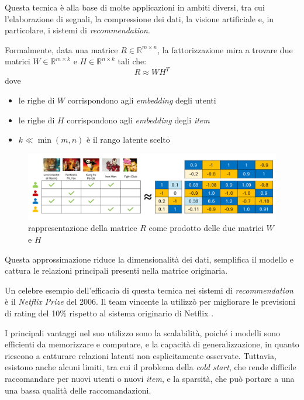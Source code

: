 Questa tecnica è alla base di molte applicazioni in ambiti diversi, tra cui l'elaborazione di segnali, la compressione dei dati, la visione artificiale e, in particolare, i sistemi di \textit{recommendation}.

Formalmente, data una matrice $R \in \mathbb{R}^{m \times n}$, la fattorizzazione mira a trovare due matrici $W \in \mathbb{R}^{m \times k}$ e $H \in \mathbb{R}^{n \times k}$ tali che:
\[
R \approx WH^T
\]
dove 
\begin{itemize}
    \item le righe di $W$ corrispondono agli \textit{embedding} degli utenti
    \item le righe di $H$ corrispondono agli \textit{embedding} degli \textit{item}
    \item $k \ll \min(m,n)$ è il rango latente scelto
\end{itemize}

\begin{figure}[H]
    \centering
    \includegraphics[scale=0.5]{figures/collaborative_filtering/matrix_factorization.PNG}
    \caption{rappresentazione della matrice $R$ come prodotto delle due matrici $W$ e $H$}
    \label{fig:matrix_factorization}
\end{figure}

Questa approssimazione riduce la dimensionalità dei dati, semplifica il modello e cattura le relazioni principali presenti nella matrice originaria.

Un celebre esempio dell'efficacia di questa tecnica nei sistemi di \textit{recommendation} è il \textit{Netflix Prize} del 2006. Il team vincente la utilizzò per migliorare le previsioni di rating del 10\% rispetto al sistema originario di Netflix \cite{TheNP}.

I principali vantaggi nel suo utilizzo sono la scalabilità, poiché i modelli sono efficienti da memorizzare e computare, e la capacità di generalizzazione, in quanto riescono a catturare relazioni latenti non esplicitamente osservate. Tuttavia, esistono anche alcuni limiti, tra cui il problema della \textit{cold start}, che rende difficile raccomandare per nuovi utenti o nuovi \textit{item}, e la sparsità, che può portare a una una bassa qualità delle raccomandazioni\cite{SVD_analysis}.

